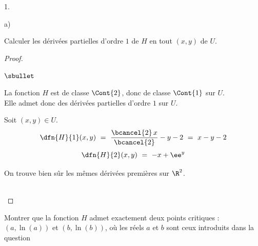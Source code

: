 \documentclass[11pt]{article}%
\begin{document}
\begin{noliste}{1.}
  \setlength{\itemsep}{4mm}
  \setcounter{enumi}{12}
  \item 
  \begin{noliste}{a)}
    \setlength{\itemsep}{2mm}
    \item Calculer les dérivées partielles d'ordre $1$ de $H$ en tout 
    $(x,y)$ de $U$.
    
    \begin{proof}~
      \begin{noliste}{$\sbullet$}
	\item La fonction $H$ est de classe $\Cont{2}$, donc de classe 
	$\Cont{1}$ sur $U$.\\
	Elle admet donc des dérivées partielles d'ordre $1$ sur $U$.
	
	\item Soit $(x,y) \in U$.
	\[
	  \dfn{H}{1}(x,y) \ = \ \dfrac{\bcancel{2} \, x}{\bcancel{2}} -y
	  -2 \ = \ x-y-2
	\]
	\[
	  \dfn{H}{2}(x,y) \ = \ -x + \ee^y
	\]
      \end{noliste}
      
      \begin{remark}
        On trouve bien sûr les mêmes dérivées premières sur $\R^2$.
      \end{remark}~\\[-1.4cm]
    \end{proof}
    
    
    \newpage
    
    
    \item Montrer que la fonction $H$ admet exactement deux points 
    critiques : $(a, \ln(a))$ et $(b,\ln(b))$, où les réels $a$ et $b$
    sont ceux introduits dans la question 
    

\end{noliste}
\end{noliste}
\end{document}
